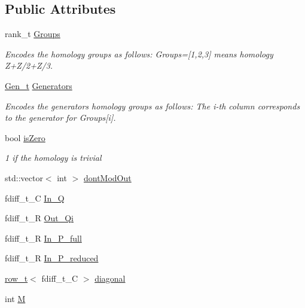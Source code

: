 \subsection*{Public Attributes}
\begin{DoxyCompactItemize}
\item 
rank\+\_\+t \hyperlink{classMackey_1_1Homology_aaae78e6463ce6e60e7f4c5861304bc5b}{Groups}
\begin{DoxyCompactList}\small\item\em Encodes the homology groups as follows\+: Groups=\mbox{[}1,2,3\mbox{]} means homology Z+\+Z/2+\+Z/3. \end{DoxyCompactList}\item 
\hyperlink{classMackey_1_1Homology_a9a8e354083ac094720820a5ff6bcff03}{Gen\+\_\+t} \hyperlink{classMackey_1_1Homology_af3eff7d2cb42b44a29f6a92172096b3d}{Generators}
\begin{DoxyCompactList}\small\item\em Encodes the generators homology groups as follows\+: The i-\/th column corresponds to the generator for Groups\mbox{[}i\mbox{]}. \end{DoxyCompactList}\item 
bool \hyperlink{classMackey_1_1Homology_ae3bb3781bab2b5884295e04a8fddf36e}{is\+Zero}
\begin{DoxyCompactList}\small\item\em 1 if the homology is trivial \end{DoxyCompactList}\item 
std\+::vector$<$ int $>$ \hyperlink{classMackey_1_1Homology_a21c18ecdeea401821a56c7c00569190b}{dont\+Mod\+Out}
\item 
fdiff\+\_\+t\+\_\+C \hyperlink{classMackey_1_1Homology_a451ad6ea31ffe0ed18111f102ec2e370}{In\+\_\+Q}
\item 
fdiff\+\_\+t\+\_\+R \hyperlink{classMackey_1_1Homology_a49fa2fbf9542e38b4000f4889f633f62}{Out\+\_\+\+Qi}
\item 
fdiff\+\_\+t\+\_\+R \hyperlink{classMackey_1_1Homology_ad2f8d8e87b9ee4f6c2db72558ab8b2a8}{In\+\_\+\+P\+\_\+full}
\item 
fdiff\+\_\+t\+\_\+R \hyperlink{classMackey_1_1Homology_ae00a8d4ac6bdfd2de79045576200c6d2}{In\+\_\+\+P\+\_\+reduced}
\item 
\hyperlink{namespaceMackey_a6d37801553e585770ca7d1243ab3b213}{row\+\_\+t}$<$ fdiff\+\_\+t\+\_\+C $>$ \hyperlink{classMackey_1_1Homology_acff409513ea412c16b84f304d097059b}{diagonal}
\item 
int \hyperlink{classMackey_1_1Homology_a94b43567580dee325fda104b9abf38e3}{M}
\end{DoxyCompactItemize}
